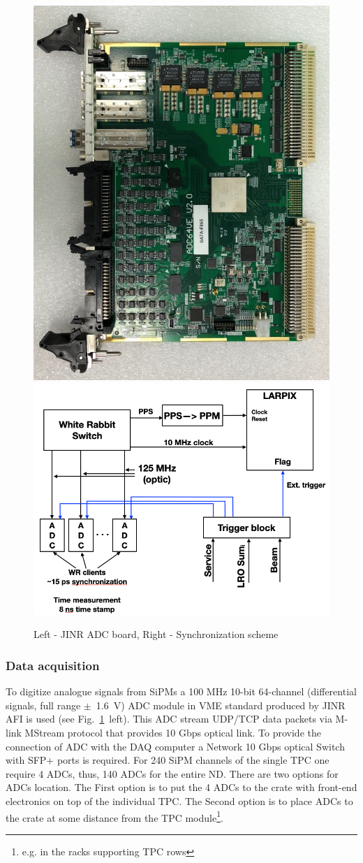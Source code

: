 \begin{figure}[htbp]
\centering 
\includegraphics[width=0.4\linewidth]{graphics/lartpc/Light/adc.png}
\qquad
\includegraphics[width=0.52\linewidth]{graphics/lartpc/Light/sync.png}
\caption{\label{fig:adc} Left - JINR ADC board, Right - Synchronization scheme}
\end{figure}


\subsubsection{Data acquisition }

To digitize analogue signals from SiPMs a 100 MHz 10-bit 64-channel (differential signals, full range $\pm$~1.6~V) ADC module in VME standard produced by JINR AFI is used (see Fig.~\ref{fig:adc}~left). This ADC stream UDP/TCP data packets via M-link MStream protocol that provides 10 Gbps optical link. To provide the connection of ADC with the DAQ computer a Network 10 Gbps optical Switch with SFP+ ports is required. For 240 SiPM channels of the single TPC one require 4 ADCs, thus, 140 ADCs for the entire ND. There are two options for ADCs location. The First option is to put the 4 ADCs to the crate with front-end electronics on top of the individual TPC. The Second option is to place ADCs to the crate at some distance from the TPC module\footnote{e.g. in the racks supporting TPC rows}.

